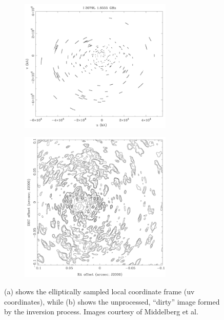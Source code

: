\documentclass[a4paper, two column]{article}
\begin{document}
\begin{figure}[h]
 \begin{mdframed}
  \begin{subfigure}[b]{\textwidth}
   \centering
   \includegraphics[width=0.8\textwidth]{uv_space.png}
   \caption{}
   \label{FIG_IMAGE_FORMATION_A}
  \end{subfigure}
  \begin{subfigure}[b]{\textwidth}
   \centering
   \includegraphics[width=0.8\textwidth]{lm_space.png}
   \caption{}
   \label{FIG_IMAGE_FORMATION_B}
  \end{subfigure}
  \caption[Sampled uv space and its image]{(a) shows the elliptically sampled local coordinate frame (uv coordinates), while (b) shows the 
					   unprocessed, ``dirty'' image formed by the inversion process. Images courtesy of Middelberg et al. \cite{middelberg2008high}}
  \label{FIG_IMAGE_FORMATION}
 \end{mdframed}
\end{figure}
\end{document}
